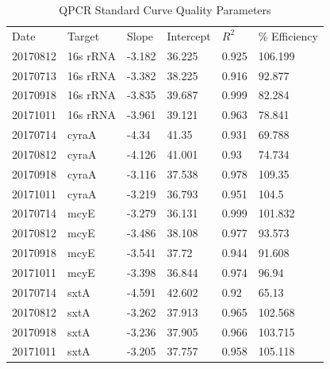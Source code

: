 
\setcounter{table}{0}
\renewcommand{\thetable}{\Alph{chapter}\arabic{table}}
 \label{ch:extra}

\begin{table}[]
	\caption{QPCR Standard Curve Quality Parameters}
	\label{tab:qpcr}
\begin{tabular}{llllll}
Date     & Target   & Slope  & Intercept & $R^2$ & \% Efficiency \\
20170812 & 16s rRNA & -3.182 & 36.225    & 0.925 & 106.199        \\
20170713 & 16s rRNA & -3.382 & 38.225    & 0.916 & 92.877         \\
20170918 & 16s rRNA & -3.835 & 39.687    & 0.999 & 82.284         \\
20171011 & 16s rRNA & -3.961 & 39.121    & 0.963 & 78.841         \\
20170714 & cyraA    & -4.34  & 41.35     & 0.931 & 69.788         \\
20170812 & cyraA    & -4.126 & 41.001    & 0.93  & 74.734         \\
20170918 & cyraA    & -3.116 & 37.538    & 0.978 & 109.35         \\
20171011 & cyraA    & -3.219 & 36.793    & 0.951 & 104.5          \\
20170714 & mcyE     & -3.279 & 36.131    & 0.999 & 101.832        \\
20170812 & mcyE     & -3.486 & 38.108    & 0.977 & 93.573         \\
20170918 & mcyE     & -3.541 & 37.72     & 0.944 & 91.608         \\
20171011 & mcyE     & -3.398 & 36.844    & 0.974 & 96.94          \\
20170714 & sxtA     & -4.591 & 42.602    & 0.92  & 65.13          \\
20170812 & sxtA     & -3.262 & 37.913    & 0.965 & 102.568        \\
20170918 & sxtA     & -3.236 & 37.905    & 0.966 & 103.715        \\
20171011 & sxtA     & -3.205 & 37.757    & 0.958 & 105.118       
\end{tabular}
\end{table}

\newpage

